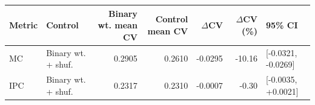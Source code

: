 \begin{tabular}{llrrrrl}
\toprule
Metric & Control & Binary wt. mean CV & Control mean CV & $\Delta$CV & $\Delta$CV (\%) & 95\% CI \\
\midrule
MC & Binary wt. + shuf. & 0.2905 & 0.2610 & -0.0295 & -10.16 & [-0.0321, -0.0269] \\
IPC & Binary wt. + shuf. & 0.2317 & 0.2310 & -0.0007 & -0.30 & [-0.0035, +0.0021] \\
\bottomrule
\end{tabular}
